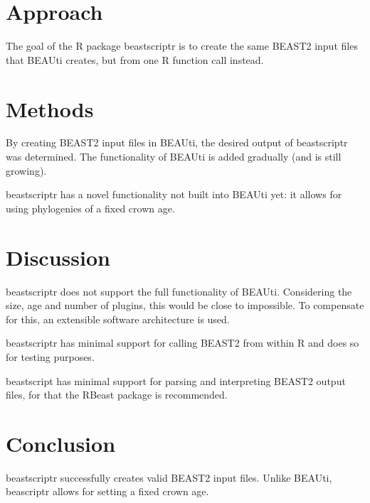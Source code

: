 \documentclass{article}
\begin{document}
\section{Approach}

The goal of the R package beastscriptr is to create the 
same BEAST2 input files that BEAUti creates, but from one R function call 
instead.

\section{Methods}

By creating BEAST2 input files in BEAUti, 
the desired output of beastscriptr was determined. 
The functionality of BEAUti is added gradually (and is still growing).

beastscriptr has a novel functionality not built into BEAUti yet:
it allows for using phylogenies of a fixed crown age. 

\section{Discussion}

beastscriptr does not support the full functionality of BEAUti. Considering
the size, age and number of plugins, this would be close to impossible.
To compensate for this, an extensible software architecture is used.

beastscriptr has minimal support for calling BEAST2 from within R and does
so for testing purposes. 

beastscript has minimal support for parsing and interpreting BEAST2 output files,
for that the RBeast package is recommended.

\section{Conclusion}

beastscriptr successfully creates valid BEAST2 input files. Unlike BEAUti,
beascriptr allows for setting a fixed crown age.





\begin{thebibliography}{}

\end{thebibliography}
\end{document}
